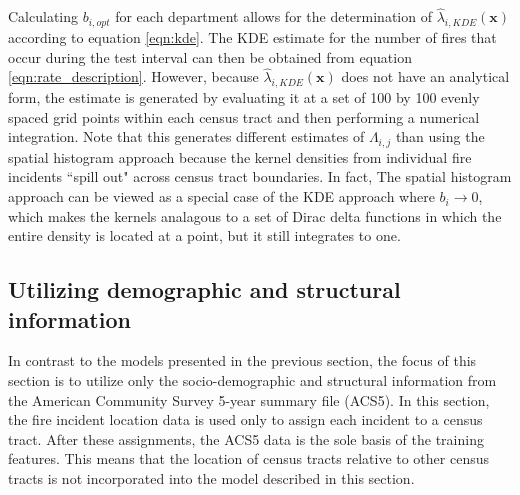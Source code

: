 \documentclass{svjour3}
\begin{document}
  Calculating $b_{i,opt}$ for each department allows for the determination of $\hat\lambda_{i,KDE}(\textbf{x})$ according to equation \ref{eqn:kde}. The KDE estimate for the number of fires that occur during the test interval can then be obtained from equation \ref{eqn:rate_description}. However, because $\hat\lambda_{i,KDE}(\textbf{x})$ does not have an analytical form, the estimate is generated by evaluating it at a set of 100 by 100 evenly spaced grid points within each census tract and then performing a numerical integration. Note that this generates different estimates of  $\Lambda_{i,j}$ than using the spatial histogram approach because the kernel densities from individual fire incidents ``spill out" across census tract boundaries. In fact, The spatial histogram approach can be viewed as a special case of the KDE approach where $b_i \rightarrow 0$, which makes the kernels analagous to a set of Dirac delta functions in which the entire density is located at a point, but it still integrates to one.
  
  
  

  \subsection{Utilizing demographic and structural information}
  In contrast to the models presented in the previous section, the focus of this section is to utilize only the socio-demographic and structural information from the American Community Survey 5-year summary file (ACS5). In this section, the fire incident location data is used only to assign each incident to a census tract. After these assignments, the ACS5 data is the sole basis of the training features. This means that the location of census tracts relative to other census tracts is not incorporated into the model described in this section.
\end{document}
